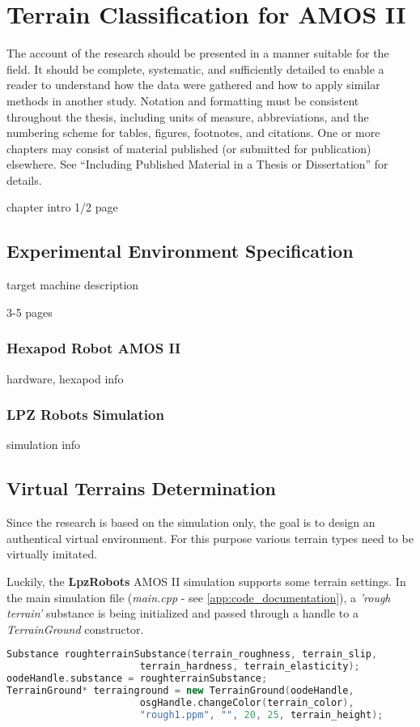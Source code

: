 \chapter{Terrain Classification for AMOS II}
\label{chapter:05:terrain_classification}

The account of the research should be presented in a manner suitable for the field. It should be complete, systematic, and sufficiently detailed to enable a reader to understand how the data were gathered and how to apply similar methods in another study. Notation and formatting must be consistent throughout the thesis, including units of measure, abbreviations, and the numbering scheme for tables, figures, footnotes, and citations. One or more chapters may consist of material published (or submitted for publication) elsewhere. See “Including Published Material in a Thesis or Dissertation” for details.

chapter intro
1/2 page

\section{Experimental Environment Specification}
target machine description

3-5 pages

\subsection{Hexapod Robot AMOS II}
hardware, hexapod info

\subsection{LPZ Robots Simulation}
simulation info

\section{Virtual Terrains Determination}
Since the research is based on the simulation only, the goal is to design an authentical virtual environment. For this purpose various terrain types need to be virtually imitated.

Luckily, the \textbf{LpzRobots} AMOS II simulation supports some terrain settings. In the main simulation file (\textit{main.cpp} - see \ref{app:code_documentation}), a \textit{'rough terrain'} substance is being initialized and passed through a handle to a \textit{TerrainGround} constructor.

\begin{lstlisting}[language=C++, caption={Setting a terrain ground in main.cpp}, label=code:terrain_ground]
Substance roughterrainSubstance(terrain_roughness, terrain_slip,
                       terrain_hardness, terrain_elasticity);
oodeHandle.substance = roughterrainSubstance;
TerrainGround* terrainground = new TerrainGround(oodeHandle, 
                       osgHandle.changeColor(terrain_color),
                       "rough1.ppm", "", 20, 25, terrain_height);
\end{lstlisting}

